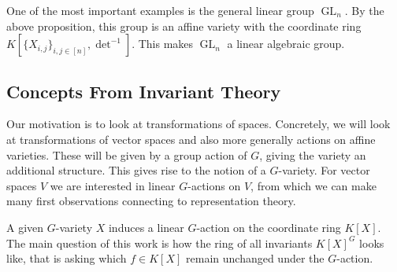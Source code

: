 \begin{dexample}
  One of the most important examples is the general linear group $\operatorname{GL}_n$.
  By the above proposition, this group is an affine variety with the coordinate ring $K[\{X_{i,j}\}_{i,j \in [n]}, \operatorname{det}^{-1}]$.
  This makes $\operatorname{GL}_n$ a linear algebraic group.
\end{dexample}


\subsection{Concepts From Invariant Theory}

Our motivation is to look at transformations of spaces.
Concretely, we will look at transformations of vector spaces and also more generally actions on affine varieties.
These will be given by a group action of $G$, giving the variety an additional structure.
This gives rise to the notion of a $G$-variety.
For vector spaces $V$ we are interested in linear $G$-actions on $V$, from which we can make many first observations connecting to representation theory.

A given $G$-variety $X$ induces a linear $G$-action on the coordinate ring $K[X]$.
The main question of this work is how the ring of all invariants $K[X]^G$ looks like, that is asking which $f \in K[X]$ remain unchanged under the $G$-action.

